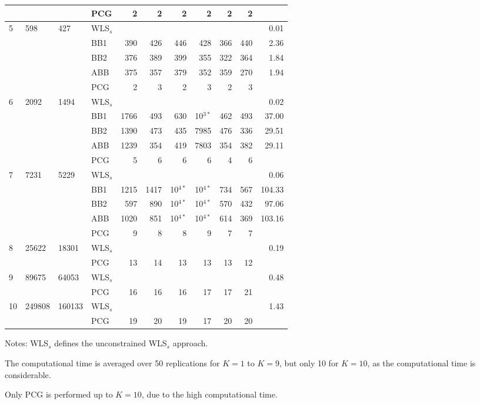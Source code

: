 \documentclass[11pt]{article}
\newcommand{\0}{\phantom{0}}
\begin{document}
\begin{table}[ht]
\begin{threeparttable}
\begin{tabular}{llllrrrrrrr}
			& & & PCG & 2 & 2 & 2 & 2 & 2 & 2 & \pmb{$0.29$} \\
			\midrule
			5 & 598 & 427 & WLS$_{s}$ & & & & & & & 0.01 \\
			& & & BB1 & 390 & 426 & 446 & 428 & 366 & 440 & 2.36 \\
			& & & BB2 & 376 & 389 & 399 & 355 & 322 & 364 & 1.84 \\
			& & & ABB & 375 & 357 & 379 & 352 & 359 & 270 & 1.94 \\
			& & & PCG & 2 & 3 & 2 & 3 & 2 & 3 & \pmb{$0.33$} \\
			\midrule		
			6 & 2092 & 1494 & WLS$_{s}$ & & & & & & & 0.02 \\
			& & & BB1 & 1766 & 493 & 630 & 10$^{3*}$ & 462 & 493 & 37.00 \\
			& & & BB2 & 1390 & 473 & 435 & 7985 & 476 & 336 & 29.51 \\
			& & & ABB & 1239 & 354 & 419 & 7803 & 354 & 382 & 29.11\\
			& & & PCG & 5 & 6 & 6 & 6 & 4 & 6 & \pmb{$0.51$} \\
			\midrule
			7 & 7231 & 5229 & WLS$_{s}$ & & & & & & & 0.06 \\
			& & & BB1 & 1215 & 1417 & 10$^{4*}$ & 10$^{4*}$ & 734 & 567 & 104.33 \\
			& & & BB2 & 597 & 890 & 10$^{4*}$ & 10$^{4*}$ & 570 & 432 & 97.06 \\
			& & & ABB & 1020 & 851 & 10$^{4*}$ & 10$^{4*}$ & 614 & 369 & 103.16 \\
			& & & PCG & 9 & 8 & 8 & 9 & 7 & 7 & \pmb{$2.09$} \\
			\midrule
			8 & 25622 & 18301 & WLS$_{s}$ & & & & & & & 0.19 \\
			& & & PCG & 13 & 14 & 13 & 13 & 13 & 12 & \pmb{$19.08$} \\
			\midrule
			9 & 89675 & 64053 & WLS$_{s}$ & & & & & & & 0.48 \\
			& & & PCG & 16 & 16 & 16 & 17 & 17 & 21 & \pmb{$244.68$} \\
			\midrule		
			10 & 249808 & 160133 & WLS$_{s}$ & & & & & & & 1.43 \\
			& & & PCG & 19 & 20 & 19 & 17 & 20 & 20 & \pmb{$1660.12$} \\
			\bottomrule
		\end{tabular}
		\begin{tablenotes}
			\item [] Notes: WLS$_{s}$ defines the unconstrained WLS$_{s}$ approach. 
			\item [] The computational time is averaged over 50 replications for $K = 1$ to $K = 9$, but only 10 for $K = 10$, as the computational time is considerable.
			\item [] Only PCG is performed up to $K = 10$, due to the high computational time.	
		\end{tablenotes}
	\end{threeparttable}
\end{table}
\end{document}
